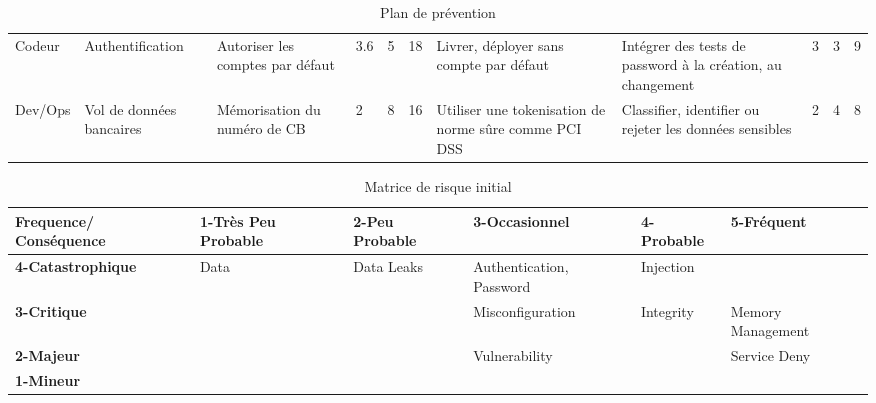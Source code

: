 \documentclass[12pt]{article}
\begin{document}
\begin{landscape}
\begin{table}[H]
{\begin{tabular}{p{1cm} p{2cm} p{2cm} p{1.5cm} p{1cm}p{1cm}p{4cm}p{3.3cm} p{1.3cm}p{1cm} p{1cm}}
Codeur & Authentification & Autoriser les comptes par défaut & 3.6 & 5 & \cellcolor{red!75} 18 & Livrer, déployer sans compte par défaut & Intégrer des tests de password à la création, au changement & 3 & 3 & \cellcolor{yellow!50} 9 \\ 
Dev/Ops & Vol de données bancaires & Mémorisation du numéro de CB & 2 & 8 & \cellcolor{red!75} 16 & Utiliser une tokenisation de norme sûre comme PCI DSS & Classifier, identifier ou rejeter les données sensibles & 2 & 4 & \cellcolor{yellow!50} 8 \\ 
\hline
\end{tabular}
}
\caption{Plan de prévention}
\label{plan_de_prevention}
\end{table}
\end{landscape}



\begin{table}[H]
\centering
\scriptsize
\begin{tabular}{|p{2cm}|p{2cm}|p{2cm}| p{2cm} |p{2cm}| p{2cm}|}
\hline \bf Frequence/ Conséquence & \bf 1-Très Peu Probable & \bf 2-Peu Probable & \bf 3-Occasionnel & \bf 4-Probable & \bf 5-Fréquent\\ [10pt]
\hline \bf 4-Catastrophique &Data\cellcolor{yellow!50} & Data Leaks\cellcolor{red!50} & Authentication, Password\cellcolor{red!50} & Injection\cellcolor{red!50} &\cellcolor{red!50} \\ [10pt]
\hline \bf 3-Critique &\cellcolor{green!50} & \cellcolor{yellow!50} & Misconfiguration \cellcolor{yellow!50} &Integrity \cellcolor{red!50} & Memory Management\cellcolor{red!50} \\ [10pt]
\hline \bf 2-Majeur & \cellcolor{green!50} & \cellcolor{green!50} & Vulnerability\cellcolor{yellow!50} &\cellcolor{yellow!50} &Service Deny\cellcolor{red!50} \\ [10pt]
\hline \bf 1-Mineur & \cellcolor{green!50} & \cellcolor{green!50} & \cellcolor{green!50} &\cellcolor{yellow!50} &\cellcolor{yellow!50} \\ [10pt]
\hline
\end{tabular}
\caption{Matrice de risque initial}

\end{table}
\end{document}
